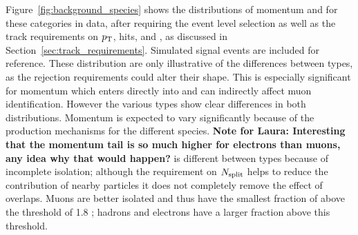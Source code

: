 Figure~\ref{fig:background_species} shows the distributions of momentum and \dedx for these categories in data, after requiring the event level selection as well as the track requirements on $p_{\mathrm{T}}$, hits, and \Nsplit, as discussed in Section~\ref{sec:track_requirements}.
Simulated signal events are included for reference.
These distribution are only illustrative of the differences between types, as the rejection requirements could alter their shape. This is especially significant for momentum which enters directly into \ep and can indirectly affect muon identification.
However the various types show clear differences in both distributions.
Momentum is expected to vary significantly because of the production mechanisms for the different species. \textbf{Note for Laura: Interesting that the momentum tail is so much higher for electrons than muons, any idea why that would happen?}
\dedx is different between types because of incomplete isolation; although the requirement on $N_{\mathrm{split}}$ helps to reduce the contribution of nearby particles it does not completely remove the effect of overlaps.
Muons are better isolated and thus have the smallest fraction of \dedx above the threshold of 1.8 \MeVgcm; hadrons and electrons have a larger fraction above this threshold.

